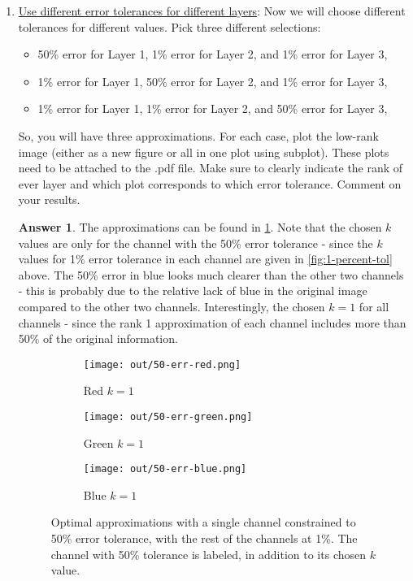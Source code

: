 \documentclass{article}
\theoremstyle{definition}
\newtheorem*{answer}{Answer}
\begin{document}
\begin{enumerate}[leftmargin=\labelsep]
\begin{enumerate}
		      \item \underline{Use different error tolerances for different layers}: Now we will choose different tolerances for different values. Pick three different selections:
		            \begin{itemize}
			            \item 50\% error for Layer 1, 1\% error for Layer 2, and 1\% error for Layer 3,
			            \item 1\% error for Layer 1, 50\% error for Layer 2, and 1\% error for Layer 3,
			            \item 1\% error for Layer 1, 1\% error for Layer 2, and 50\% error for Layer 3,
		            \end{itemize}
		            So, you will have three approximations. For each case, plot the low-rank image (either as a new figure or all in one plot using subplot). These plots need to be attached to the .pdf file. Make sure to clearly indicate the rank of ever layer and which plot corresponds to which error tolerance. Comment on your results.
		            \begin{answer}
			            The approximations can be found in \cref{fig:channel-tol}. Note that the chosen \(k\) values are only for the channel with the 50\% error tolerance - since the \(k\) values for 1\% error tolerance in each channel are given in \cref{fig:1-percent-tol} above. The 50\% error in blue looks much clearer than the other two channels - this is probably due to the relative lack of blue in the original image compared to the other two channels. Interestingly, the chosen \(k = 1\) for all channels - since the rank 1 approximation of each channel includes more than 50\% of the original information.
			            \begin{figure}[H]
				            \centering
				            \begin{subfigure}{0.225\textwidth}
					            \centering
					            \texttt{[image: out/50-err-red.png]}
					            \caption{Red \(k = 1\)}
				            \end{subfigure}\qquad
				            \begin{subfigure}{0.225\textwidth}
					            \centering
					            \texttt{[image: out/50-err-green.png]}
					            \caption{Green \(k = 1\)}
				            \end{subfigure}\qquad
				            \begin{subfigure}{0.225\textwidth}
					            \centering
					            \texttt{[image: out/50-err-blue.png]}
					            \caption{Blue \(k = 1\)}
				            \end{subfigure}
				            \caption{Optimal approximations with a single channel constrained to 50\% error tolerance, with the rest of the channels at 1\%. The channel with 50\% tolerance is labeled, in addition to its chosen \(k\) value.}\label{fig:channel-tol}
			            \end{figure}


\end{answer}
\end{enumerate}
\end{enumerate}
\end{document}
